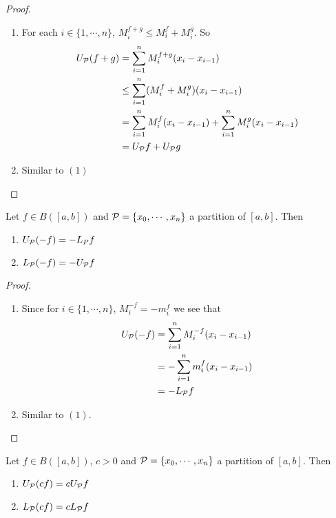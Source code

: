 \documentclass{book}
\begin{document}
	\begin{proof} \
		\begin{enumerate}
			\item For each $i \in \{1, \cdots, n\}$, $M^{f+g}_i \leq M^f_i + M^g_i$. So 
			\begin{align*}
				U_{\mathcal{P}} (f+g) 
				&= \sum_{i=1}^n M^{f+g}_i (x_i - x_{i-1}) \\
				& \leq \sum_{i=1}^n (M^f_i + M^g_i)(x_i - x_{i-1}) \\
				&= \sum_{i=1}^n M^f_i(x_i - x_{i-1}) + \sum_{i=1}^n M^g_i(x_i - x_{i-1}) \\
				&= U_{\mathcal{P}} f + U_{\mathcal{P}} g
			\end{align*}
			\item Similar to $(1)$
		\end{enumerate}
	\end{proof}

	\begin{ex}  
		Let $f \in B([a,b])$ and $\mathcal{P} = \{x_0, \cdots, x_n\}$ a partition of $[a,b]$. Then 
		\begin{enumerate}
			\item $U_{\mathcal{P}} (-f) = -L_P f$
			\item $L_{\mathcal{P}} (-f) = - U_{\mathcal{P}} f$
		\end{enumerate}
	\end{ex}

	\begin{proof}\
		\begin{enumerate}
			\item Since for $i \in \{1, \cdots, n\}$, $M^{-f}_i = -m^f_i$ we see that 
			\begin{align*}
				U_{\mathcal{P}}(-f) 
				&= \sum_{i=1}^n M^{-f}_i(x_i - x_{i-1}) \\
				&= - \sum_{i=1}^n m^f_i(x_i - x_{i-1}) \\
				&= - L_{\mathcal{P}} f
			\end{align*}
			\item Similar to $(1)$.
		\end{enumerate}
	\end{proof}

	\begin{ex}  
		Let $f \in B([a,b])$, $c >0$ and $\mathcal{P} = \{x_0, \cdots, x_n\}$ a partition of $[a,b]$. Then 
		\begin{enumerate}
			\item $U_{\mathcal{P}} (cf) = c U_{\mathcal{P}} f$ 
			\item $L_{\mathcal{P}} (cf) = c L_{\mathcal{P}} f $
		\end{enumerate}
	\end{ex}
\end{document}
